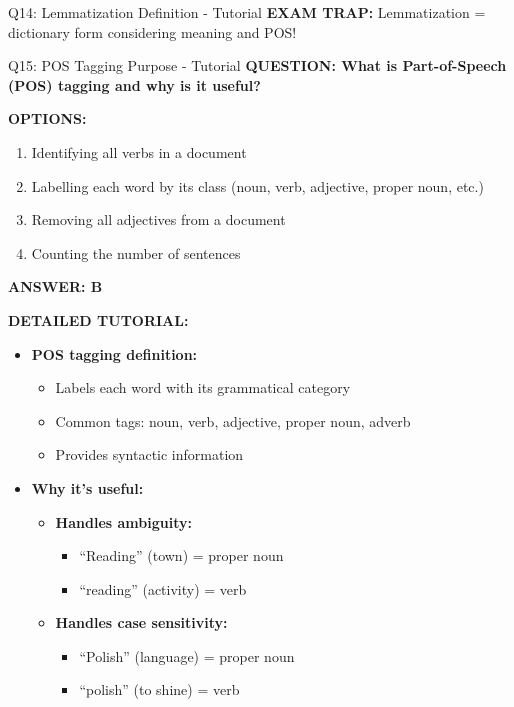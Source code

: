 \documentclass[8pt]{beamer}
\begin{document}
\begin{frame}{Q14: Lemmatization Definition - Tutorial}
		\textcolor{myred}{\textbf{EXAM TRAP:}} Lemmatization = \textcolor{myblue}{dictionary form considering meaning and POS}!
	\end{frame}
	


\begin{frame}{Q15: POS Tagging Purpose - Tutorial}
	\fontsize{6.5}{7.5}\selectfont
	\textbf{QUESTION: What is Part-of-Speech (POS) tagging and why is it useful?}
	
	\vspace{0.1cm}
	\textbf{OPTIONS:}
	\begin{enumerate}
		\item Identifying all verbs in a document
		\item Labelling each word by its class (noun, verb, adjective, proper noun, etc.)
		\item Removing all adjectives from a document
		\item Counting the number of sentences
	\end{enumerate}
	
	\vspace{0.1cm}
	\textcolor{myblue}{\textbf{ANSWER: B}}
	
	\vspace{0.1cm}
	\textbf{DETAILED TUTORIAL:}
	\begin{itemize}
		\item \textbf{POS tagging definition:}
		\begin{itemize}
			\item Labels each word with its grammatical category
			\item Common tags: noun, verb, adjective, proper noun, adverb
			\item Provides syntactic information
		\end{itemize}
		
		\item \textbf{Why it's useful:}
		\begin{itemize}
			\item \textbf{Handles ambiguity:}
			\begin{itemize}
				\item ``Reading'' (town) = proper noun
				\item ``reading'' (activity) = verb
			\end{itemize}
			
			\item \textbf{Handles case sensitivity:}
			\begin{itemize}
				\item ``Polish'' (language) = proper noun
				\item ``polish'' (to shine) = verb
			\end{itemize}
			

\end{itemize}
\end{itemize}
\end{frame}
\end{document}
